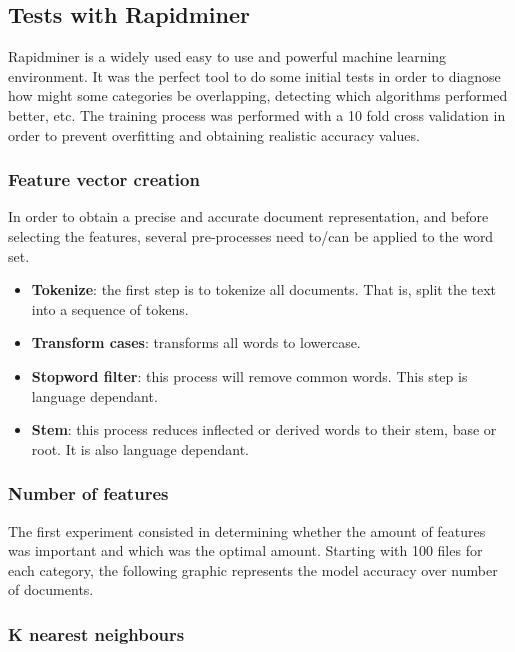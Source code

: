   


\subsection{Tests with Rapidminer}
Rapidminer\cite{rapidminer} is a widely used easy to use and powerful machine learning environment.  
It was the perfect tool to do some initial tests in order to diagnose how might some categories be overlapping, detecting which algorithms performed better, etc. The training process was 
performed with a 10 fold cross validation in order to prevent overfitting and obtaining realistic accuracy values.

\subsubsection{Feature vector creation}
In order to obtain a precise and accurate document representation, and before selecting the features, several pre-processes need to/can be applied to the word set.
\begin{itemize}
  \item {\bf Tokenize}: the first step is to tokenize all documents. That is, split the text into a sequence of tokens. 
  \item {\bf Transform cases}: transforms all words to lowercase.
  \item {\bf Stopword filter}: this process will remove common words. This step is language dependant.
  \item {\bf Stem}: this process reduces inflected or derived words to their stem, base or root. It is also language dependant.
\end{itemize}



\subsubsection{Number of features}
The first experiment consisted in determining whether the amount of features was important and which was the optimal amount. Starting with 100 files for each category, the following graphic
represents the model accuracy over number of documents. 

\subsubsection{K nearest neighbours}


